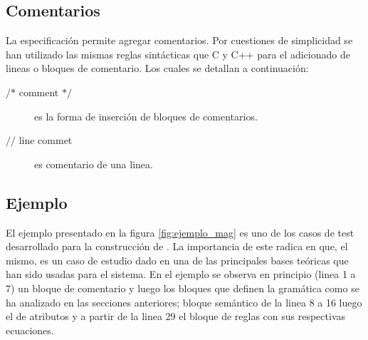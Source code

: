 \subsection{Comentarios}
La especificación permite agregar comentarios. Por cuestiones de simplicidad se han utilizado las mismas reglas sintácticas que C y C++ para el adicionado de lineas o bloques de comentario. Los cuales se detallan a continuación:
\begin{description}
 \item [$\textbf{/*}$ comment $\textbf{*/}$] es la forma de inserción de bloques de comentarios.
 \item [$\textbf{//}$ line commet] es comentario de una linea.
\end{description} 

\subsection{Ejemplo}
El ejemplo presentado en la figura \ref{fig:ejemplo_mag} es uno de los casos de test desarrollado para la construcción de \maggen. La importancia de este radica en que, el mismo, es un caso de estudio dado en una de las principales bases teóricas que han sido usadas para el sistema. 
En el ejemplo se observa en principio (linea 1 a 7) un bloque de comentario y luego los bloques que definen la gramática como se ha analizado en las secciones anteriores; bloque semántico de la linea 8 a 16 luego el de atributos y a partir de la linea 29 el bloque de reglas con sus respectivas ecuaciones.


